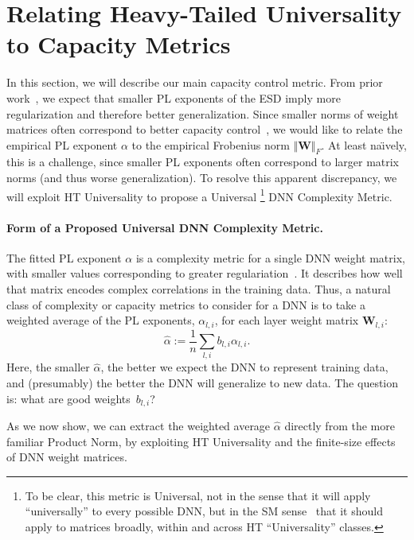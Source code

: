 \section{Relating Heavy-Tailed Universality to Capacity Metrics}
\label{sxn:theory-new}

In this section, we will describe our main capacity control metric.
%
From prior work~\cite{MM18_TR}, we expect that smaller PL exponents of the ESD imply more regularization and therefore better generalization. 
Since smaller norms of weight matrices often correspond to better capacity control~\cite{LMBx18_TR,SHNx17_TR,PLMx18_TR,BFT17_TR}, we would like to relate the empirical PL exponent $\alpha$ to the empirical Frobenius norm $\Vert\mathbf{W}\Vert_{F}$.
At least na\"{\i}vely, this is a challenge, since smaller PL exponents often correspond to larger matrix norms (and thus worse generalization).
To resolve this apparent discrepancy, we will exploit HT Universality to propose a Universal%
\footnote{To be clear, this metric is Universal, not in the sense that it will apply ``universally'' to every possible DNN, but in the SM sense~\cite{SornetteBook,BouchaudPotters03} that it should apply to matrices broadly, within and across HT ``Universality'' classes.}
DNN Complexity Metric.


\paragraph{Form of a Proposed Universal DNN Complexity Metric.} 

The fitted PL exponent $\alpha$ is a complexity metric for a single DNN weight matrix, with smaller values corresponding to greater regulariation~\cite{MM18_TR}.
It describes how well that matrix encodes complex correlations in the training data.
Thus, a natural class of complexity or capacity metrics to consider for a DNN is to take a weighted average of the PL exponents, $\alpha_{l,i}$, for each layer weight matrix $\mathbf{W}_{l,i}$:
\begin{equation}
\hat{\alpha}:=\dfrac{1}{n}\sum_{l,i}b_{l,i}\alpha_{l,i}  .
\label{eqn:alpha_hat_generic}
\end{equation}
Here, the smaller $\hat{\alpha}$, the better we expect the DNN to represent training data, and (presumably) the better the DNN will generalize to new data.
The question is: what are good weights~$b_{l,i}$?

As we now show, we can extract the weighted average $\hat{\alpha}$ directly from the more familiar Product Norm, by exploiting HT Universality and the finite-size effects of DNN weight matrices.


